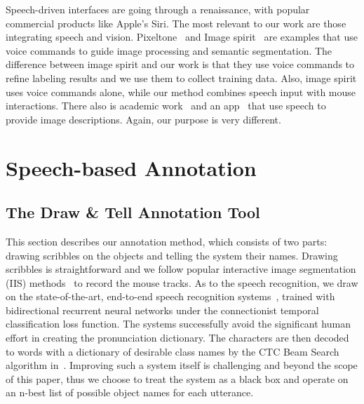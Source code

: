 Speech-driven interfaces are going through a renaissance, with popular
commercial products like Apple's Siri. The most relevant to our work
are those integrating speech and vision. Pixeltone~\citep{pixel:tone}
and Image spirit~\citep{image:spirit} are examples that use voice
commands to guide image processing and semantic segmentation. The
difference between image spirit and our work is that they use voice
commands to refine labeling results and we use them to collect
training data. Also, image spirit uses voice commands alone, while our
method combines speech input with mouse interactions. There also is
academic work~\citep{show:tell, speech:anno:img, speech:retri:img,
  video:anno:knowledgebase} and an app~\citep{smile} that use speech to
provide image descriptions.  Again, our purpose is very different.


\section{Speech-based Annotation}
\label{drawtell:sec:annotation}

\subsection{The Draw \& Tell Annotation Tool}

This section describes our annotation method, which consists of two 
parts: drawing scribbles on the objects and telling the system their 
names. Drawing scribbles is straightforward and we follow popular
interactive image segmentation (IIS) methods~\citep{geodesic:star} to
record the mouse tracks. As to the speech recognition, we draw on the state-of-the-art, end-to-end speech recognition systems~\citep{end-to-end:speech}, trained with bidirectional recurrent neural networks under the connectionist temporal classification loss function. The systems successfully avoid the significant human effort in creating the pronunciation dictionary. The characters are then decoded to words with a dictionary of desirable class names by the CTC Beam Search algorithm in~\citep{end-to-end:speech}. Improving such a system itself is challenging and beyond the scope of this paper, thus we choose to treat the system as a black box and operate on an n-best list of possible object names for each utterance. 

